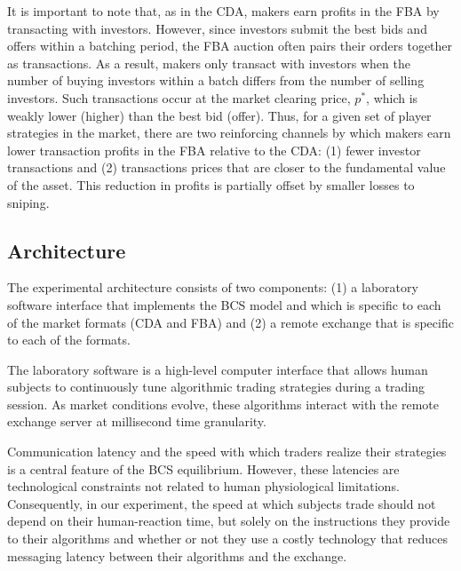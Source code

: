 \documentclass[12pt]{article}
\begin{document}
It is important to note that, as in the CDA, makers earn profits in the FBA by transacting with investors. However, since investors submit the best bids and offers within a batching period, the FBA auction often pairs their orders together as transactions. As a result, makers only transact with investors when the number of buying investors within a batch differs from the number of selling investors. Such transactions occur at the market clearing price, $p^*$, which is weakly lower (higher) than  the best bid (offer). Thus, for a given set of player strategies in the market, there are two reinforcing channels by which makers earn lower transaction profits in the FBA relative to the CDA: (1) fewer investor transactions and (2) transactions prices that are closer to the fundamental value of the asset. This reduction in profits is partially offset by smaller losses to sniping.

\subsection{Architecture}

The experimental architecture consists of two components: (1) a laboratory software interface that implements the BCS model and which is specific to each of the market formats (CDA and FBA) and (2) a remote exchange that is specific to each of the formats.

The laboratory software is a high-level computer interface that allows human subjects to continuously tune algorithmic trading strategies during a trading session. As market conditions evolve, these algorithms interact with the remote exchange server at millisecond time granularity. 

Communication latency and the speed with which traders realize their strategies is a central feature of the BCS equilibrium. However, these latencies are technological constraints not related to human physiological limitations. Consequently, in our experiment, the speed at which subjects trade should not depend on their human-reaction time, but solely on the instructions they provide to their algorithms and whether or not they use a costly technology that reduces messaging latency between their algorithms and the exchange.
\end{document}
